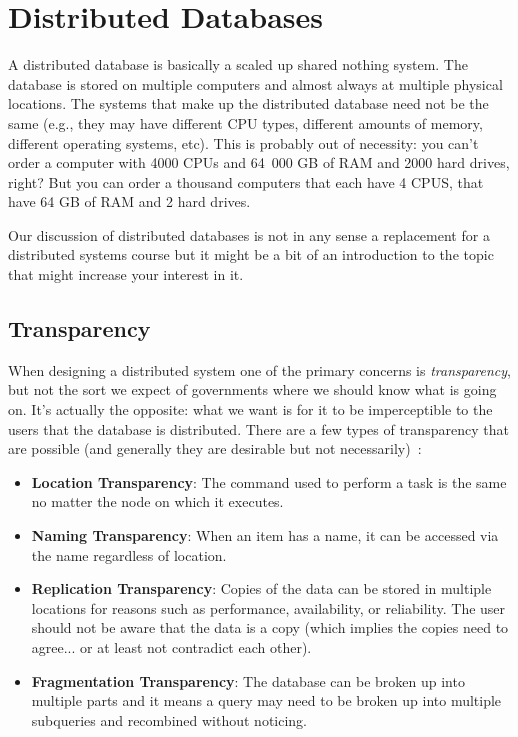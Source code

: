 




\section*{Distributed Databases}

A distributed database is basically a scaled up shared nothing system. The database is stored on multiple computers and almost always at multiple physical locations. The systems that make up the distributed database need not be the same (e.g., they may have different CPU types, different amounts of memory, different operating systems, etc). This is probably out of necessity: you can't order a computer with 4000 CPUs and 64~000 GB of RAM and 2000 hard drives, right? But you can order a thousand computers that each have 4 CPUS, that have 64 GB of RAM and 2 hard drives.

Our discussion of distributed databases is not in any sense a replacement for a distributed systems course but it might be a bit of an introduction to the topic that might increase your interest in it. 


\subsection*{Transparency}
When designing a distributed system one of the primary concerns is \textit{transparency}, but not the sort we expect of governments where we should know what is going on. It's actually the opposite: what we want is for it to be imperceptible to the users that the database is distributed. There are a few types of transparency that are possible (and generally they are desirable but not necessarily)~\cite{fds}:

\begin{itemize}
	\item \textbf{Location Transparency}: The command used to perform a task is the same no matter the node on which it executes.
	\item \textbf{Naming Transparency}: When an item has a name, it can be accessed via the name regardless of location.
	\item \textbf{Replication Transparency}: Copies of the data can be stored in multiple locations for reasons such as performance, availability, or reliability. The user should not be aware that the data is a copy (which implies the copies need to agree... or at least not contradict each other).
	\item \textbf{Fragmentation Transparency}: The database can be broken up into multiple parts and it means a query may need to be broken up into multiple subqueries and recombined without noticing. 
\end{itemize}

